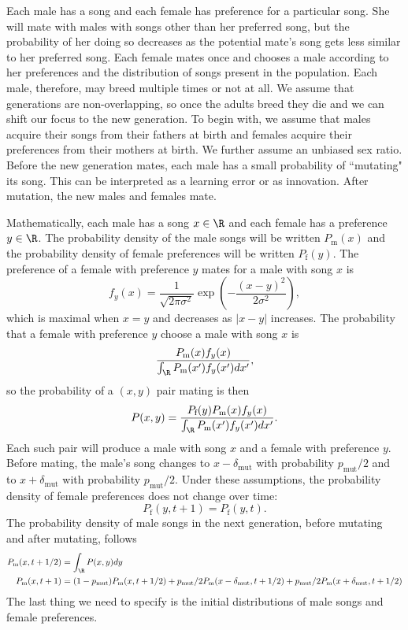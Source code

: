 \documentclass{article}\usepackage[]{graphicx}\usepackage[]{color}
\begin{document}
Each male has a song and each female has preference for a particular song. She will mate with males with songs other than her preferred song, but the probability of her doing so decreases as the potential mate's song gets less similar to her preferred song. Each female mates once and chooses a male according to her preferences and the distribution of songs present in the population. Each male, therefore, may breed multiple times or not at all. We assume that generations are non-overlapping, so once the adults breed they die and we can shift our focus to the new generation. To begin with, we assume that males acquire their songs from their fathers at birth and females acquire their preferences from their mothers at birth. We further assume an unbiased sex ratio. Before the new generation mates, each male has a small probability of ``mutating" its song. This can be interpreted as a learning error or as innovation. After mutation, the new males and females mate. 

Mathematically, each male has a song $x\in \R$ and each female has a preference $y\in\R$. The probability density of the male songs will be written $P_\text{m}(x)$ and the probability density of female preferences will be written $P_\text{f}(y)$. The preference of a female with preference $y$ mates for a male with song $x$ is 
\begin{equation*}
f_y(x)=\frac{1}{\sqrt{2 \pi \sigma^2}}\exp\left(-\frac{(x-y)^2}{2\sigma^2}\right),
\end{equation*}
which is maximal when $x=y$ and decreases as $|x-y|$ increases. The probability that a female with preference $y$ choose a male with song $x$ is 
\begin{equation*}
\frac{P_\text{m}(x)f_y(x)}{\int_\R P_\text{m}(x')f_y(x')dx'},
\end{equation*}
so the probability of a $(x,y)$ pair mating is then
\begin{equation*}
P(x,y)=\frac{P_\text{f}(y)P_\text{m}(x)f_y(x)}{\int_\R P_\text{m}(x')f_y(x')dx'}.
\end{equation*}
Each such pair will produce a male with song $x$ and a female with preference $y$. Before mating, the male's song changes to $x-\delta_\text{mut}$ with probability $p_\text{mut}/2$ and to $x+\delta_\text{mut}$ with probability $p_\text{mut}/2$. Under these assumptions, the probability density of female preferences does not change over time:
\begin{equation*}
P_\text{f}(y,t+1)=P_\text{f}(y,t).
\end{equation*}
The probability density of male songs in the next generation, before mutating and after mutating, follows
\begin{align*}
P_\text{m}(x,t+1/2)&=\int_\R P(x,y) dy
\\P_\text{m}(x,t+1)&=(1-p_\text{mut})P_\text{m}(x,t+1/2)+p_\text{mut}/2P_\text{m}(x-\delta_\text{mut},t+1/2)+p_\text{mut}/2P_\text{m}(x+\delta_\text{mut},t+1/2)
\end{align*}
The last thing we need to specify is the initial distributions of male songs and female preferences. 
\end{document}
